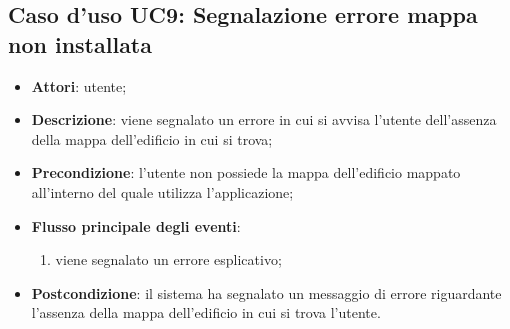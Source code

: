 \documentclass[../AnalisiDeiRequisiti.tex]{subfiles}
\begin{document}
\subsection{Caso d'uso UC9: Segnalazione errore mappa non installata}
\begin{itemize}
	\item \textbf{Attori}: utente;
	\item \textbf{Descrizione}: viene segnalato un errore in cui si avvisa l'utente dell'assenza della mappa dell'edificio in cui si trova; 
	\item \textbf{Precondizione}: l'utente non possiede la mappa dell'edificio mappato all'interno del quale utilizza l'applicazione;
	
	\item \textbf{Flusso principale degli eventi}:
	\begin{enumerate}
		\item viene segnalato un errore esplicativo;
		
	\end{enumerate}
	\item \textbf{Postcondizione}: il sistema ha segnalato un messaggio di errore riguardante l'assenza della mappa dell'edificio in cui si trova l'utente.
\end{itemize}
\end{document}
